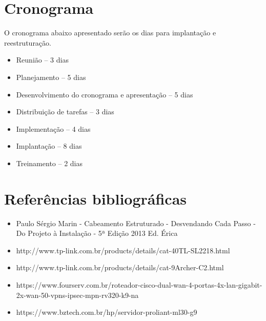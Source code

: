 \documentclass[	DIV=calc,%
							paper=a4,%
							fontsize=12pt,%
							onecolumn]{scrartcl}	 					%
\begin{document}
\section{Cronograma}
O cronograma abaixo apresentado serão os dias para implantação e reestruturação.
\begin{itemize}
	\item Reunião – 3 dias
	\item Planejamento – 5 dias
	\item Desenvolvimento do cronograma e apresentação – 5 dias
	\item Distribuição de tarefas – 3 dias
	\item Implementação – 4 dias
	\item Implantação – 8 dias
	\item Treinamento – 2 dias
\end{itemize}



\section{Referências bibliográficas}
\begin{itemize}
	\item  Paulo Sérgio Marin - Cabeamento Estruturado - Desvendando Cada Passo - Do Projeto à Instalação - 5ª Edição 2013 Ed. Érica
	\item http://www.tp-link.com.br/products/details/cat-40TL-SL2218.html
	\item http://www.tp-link.com.br/products/details/cat-9Archer-C2.html 
	\item https://www.fourserv.com.br/roteador-cisco-dual-wan-4-portas-4x-lan-gigabit-2x-wan-50-vpns-ipsec-mpn-rv320-k9-na
	\item https://www.bztech.com.br/hp/servidor-proliant-ml30-g9
\end{itemize}  


\end{document}
